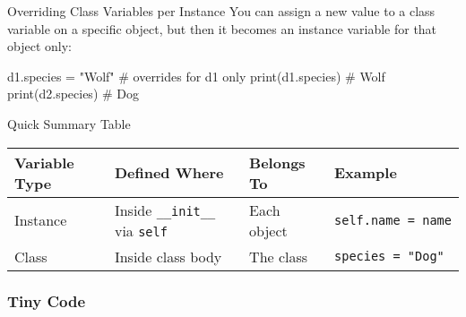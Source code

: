 \documentclass[
  letterpaper,
  DIV=11,
  numbers=noendperiod]{scrreprt}
\newenvironment{Shaded}{\begin{snugshade}}{\end{snugshade}}
\newcommand{\BuiltInTok}[1]{\textcolor[rgb]{0.00,0.23,0.31}{#1}}
\newcommand{\CommentTok}[1]{\textcolor[rgb]{0.37,0.37,0.37}{#1}}
\newcommand{\NormalTok}[1]{\textcolor[rgb]{0.00,0.23,0.31}{#1}}
\newcommand{\OperatorTok}[1]{\textcolor[rgb]{0.37,0.37,0.37}{#1}}
\newcommand{\StringTok}[1]{\textcolor[rgb]{0.13,0.47,0.30}{#1}}
\begin{document}
Overriding Class Variables per Instance You can assign a new value to a
class variable on a specific object, but then it becomes an instance
variable for that object only:

\begin{Shaded}
\begin{Highlighting}[]
\NormalTok{d1.species }\OperatorTok{=} \StringTok{"Wolf"}   \CommentTok{\# overrides for d1 only}
\BuiltInTok{print}\NormalTok{(d1.species)     }\CommentTok{\# Wolf}
\BuiltInTok{print}\NormalTok{(d2.species)     }\CommentTok{\# Dog}
\end{Highlighting}
\end{Shaded}

Quick Summary Table

\begin{longtable}[]{@{}
  >{\raggedright\arraybackslash}p{}
  >{\raggedright\arraybackslash}p{}
  >{\raggedright\arraybackslash}p{}
  >{\raggedright\arraybackslash}p{}@{}}
\toprule\noalign{}
\begin{minipage}[b]{\linewidth}\raggedright
Variable Type
\end{minipage} & \begin{minipage}[b]{\linewidth}\raggedright
Defined Where
\end{minipage} & \begin{minipage}[b]{\linewidth}\raggedright
Belongs To
\end{minipage} & \begin{minipage}[b]{\linewidth}\raggedright
Example
\end{minipage} \\
\midrule\noalign{}
\endhead
\bottomrule\noalign{}
\endlastfoot
Instance & Inside \texttt{\_\_init\_\_} via \texttt{self} & Each object
& \texttt{self.name\ =\ name} \\
Class & Inside class body & The class & \texttt{species\ =\ "Dog"} \\
\end{longtable}

\subsubsection{Tiny Code}\label{tiny-code-63}
\end{document}
